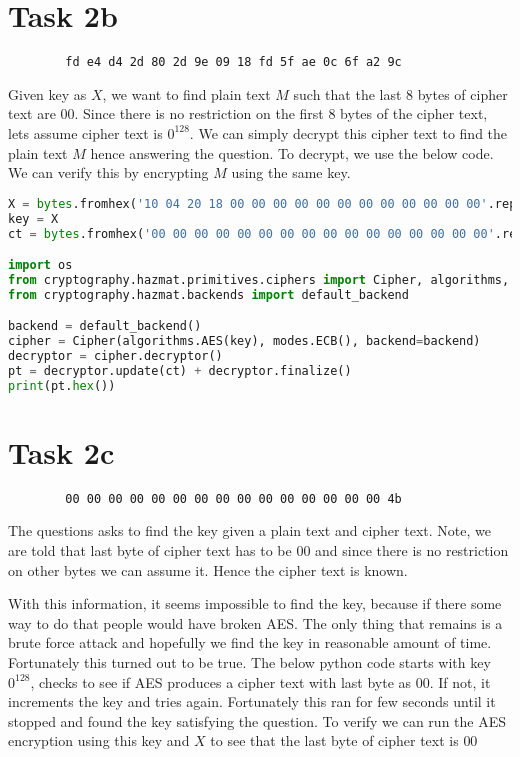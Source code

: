\documentclass{article}
\begin{document}
    \section*{Task 2b}
    \begin{verbatim}
        fd e4 d4 2d 80 2d 9e 09 18 fd 5f ae 0c 6f a2 9c
    \end{verbatim}

    Given key as $X$, we want to find plain text $M$ such that the last 8 bytes of cipher text are $00$. Since there is no restriction on the first 8 bytes of the cipher text, lets assume cipher text is $0^{128}$. We can simply decrypt this cipher text to find the plain text $M$ hence answering the question. To decrypt, we use the below code. We can verify this by encrypting $M$ using the same key.

    \begin{lstlisting}[language=Python]
X = bytes.fromhex('10 04 20 18 00 00 00 00 00 00 00 00 00 00 00 00'.replace(' ', ''))
key = X
ct = bytes.fromhex('00 00 00 00 00 00 00 00 00 00 00 00 00 00 00 00'.replace(' ', ''))

import os
from cryptography.hazmat.primitives.ciphers import Cipher, algorithms, modes
from cryptography.hazmat.backends import default_backend

backend = default_backend()
cipher = Cipher(algorithms.AES(key), modes.ECB(), backend=backend)
decryptor = cipher.decryptor()
pt = decryptor.update(ct) + decryptor.finalize()
print(pt.hex())
    \end{lstlisting}

    \section*{Task 2c}
    \begin{verbatim}
        00 00 00 00 00 00 00 00 00 00 00 00 00 00 00 4b
    \end{verbatim}

    The questions asks to find the key given a plain text and cipher text. Note, we are told that last byte of cipher text has to be $00$ and since there is no restriction on other bytes we can assume it. Hence the cipher text is known.

    With this information, it seems impossible to find the key, because if there some way to do that people would have broken AES. The only thing that remains is a brute force attack and hopefully we find the key in reasonable amount of time. Fortunately this turned out to be true. The below python code starts with key $0^{128}$, checks to see if AES produces a cipher text with last byte as $00$. If not, it increments the key and tries again. Fortunately this ran for few seconds until it stopped and found the key satisfying the question. To verify we can run the AES encryption using this key and $X$ to see that the last byte of cipher text is $00$
\end{document}
